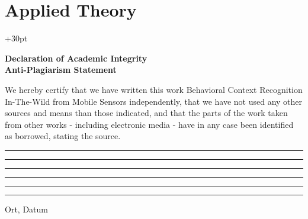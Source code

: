 \documentclass[a4paper,12pt]{scrartcl}
\begin{document}
\newpage
\setcounter{page}{1}









\section{Applied Theory}





























\newpage

\printbibliography
\hangindent+30pt 


\newpage
{}
\vspace*{1cm}
\begin{center}
	\Large \textbf{Declaration of Academic Integrity}\\
	
	\large \textbf{Anti-Plagiarism Statement}
\end{center}

\normalsize
\vspace{25mm}
We hereby certify that we have written this work \grqq Behavioral Context Recognition In-The-Wild from Mobile Sensors\grqq{} independently, that we have not used any other sources and means than those indicated, and that the parts of the work taken from other works - including electronic media - have in any case been identified as borrowed, stating the source.\\


\begin{center}
	\rule{6cm}{.5pt} \hspace{3cm} \rule{6cm}{.5pt}
\end{center}
\vspace{1cm}
\begin{center}
	\rule{6cm}{.5pt} \hspace{3cm} \rule{6cm}{.5pt}
\end{center}

\vspace{3cm}
	\begin{center}
	\rule{6cm}{.5pt} \hspace{3cm} \rule{6cm}{0pt}
\end{center}	
\vspace{-5mm}
\hspace*{25mm} Ort, Datum	
\end{document}

